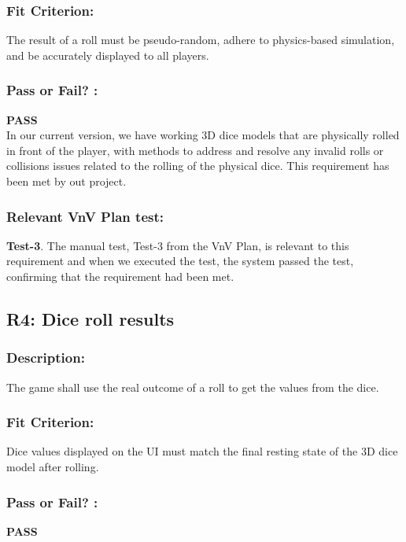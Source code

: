 \documentclass[12pt, titlepage]{article}
\begin{document}
\subsubsection*{Fit Criterion:} The result of a roll must be pseudo-random, adhere to physics-based simulation, and be accurately displayed to all players.

\subsubsection*{Pass or Fail? :} 

 \noindent \textbf{PASS}\\
 
 In our current version, we have working 3D dice models that are physically rolled in front of the player, with methods to address and resolve any invalid rolls or collisions issues related to the rolling of the physical dice.  This requirement has been met by out project.

 \subsubsection*{Relevant VnV Plan test: }  \textbf{ Test-3}. The manual test, Test-3 from the VnV Plan, is relevant to this requirement and when we executed the test, the system passed the test, confirming that the requirement had been met.


\subsection{R4: Dice roll results} 
\label{R4} 

\subsubsection*{Description:}The game shall use the real outcome of a roll to get the values from the dice.
  
\subsubsection*{Fit Criterion:} Dice values displayed on the UI must match the final resting state of the 3D dice model after rolling.

\subsubsection*{Pass or Fail? :} 
 
  \noindent \textbf{PASS}\\
 
\end{document}
